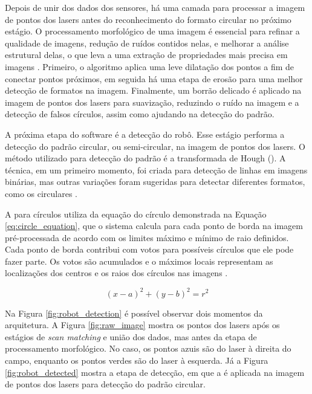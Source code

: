 \documentclass[acronym, symbols, table, deposito]{fei}
\begin{document}
				Depois de unir dos dados dos sensores, há uma camada para processar a imagem de pontos dos lasers antes do reconhecimento do formato circular no próximo estágio. O processamento morfológico de uma imagem é essencial para refinar a qualidade de imagens, redução de ruídos contidos nelas, e melhorar a análise estrutural delas, o que leva a uma extração de propriedades mais precisa em imagens \cite{lotufo2023morphological}. Primeiro, o algoritmo aplica uma leve dilatação dos pontos a fim de conectar pontos próximos, em seguida há uma etapa de erosão para uma melhor detecção de formatos na imagem. Finalmente, um borrão delicado é aplicado na imagem de pontos dos lasers para suavização, reduzindo o ruído na imagem e a detecção de falsos círculos, assim como ajudando na detecção do padrão.
			
				A próxima etapa do software é a detecção do robô. Esse estágio performa a detecção do padrão circular, ou semi-circular, na imagem de pontos dos lasers. O método utilizado para detecção do padrão é a transformada de Hough (). A técnica, em um primeiro momento, foi criada para detecção de linhas em imagens binárias, mas outras variações foram sugeridas para detectar diferentes formatos, como os circulares \cite{mukhopadhyay2015survey}.
				
				A  para círculos utiliza da equação do círculo demonstrada na Equação \eqref{eq:circle_equation}, que o sistema calcula para cada ponto de borda na imagem pré-processada de acordo com os limites máximo e mínimo de raio definidos. Cada ponto de borda contribui com votos para possíveis círculos que ele pode fazer parte. Os votos são acumulados e o máximos locais representam as localizações dos centros e os raios dos círculos nas imagens \cite{hassanein2015survey}.
				
				\begin{equation}
					\label{eq:circle_equation}
					(x-a)^2 + (y-b)^2 = r^2
				\end{equation}
			
				Na Figura \ref{fig:robot_detection} é possível observar dois momentos da arquitetura. A Figura \ref{fig:raw_image} mostra os pontos dos lasers após os estágios de \textit{scan matching} e união dos dados, mas antes da etapa de processamento morfológico. No caso, os pontos azuis são do laser à direita do campo, enquanto os pontos verdes são do laser à esquerda. Já a Figura \ref{fig:robot_detected} mostra a etapa de detecção, em que a  é aplicada na imagem de pontos dos lasers para detecção do padrão circular.
				
\end{document}
